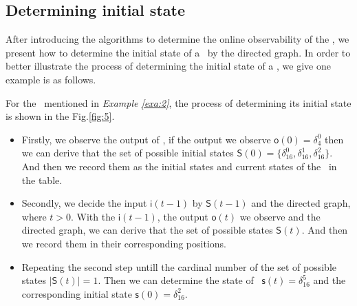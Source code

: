 \subsection{Determining initial state}

After introducing the algorithms to determine the online observability of the \BCNs, we present how to determine the initial state of a \BCN\ by the directed graph. In order to better illustrate the process of determining the initial state of a \BCN, we give one example is as follows.
\begin{example}
For the \BCN\ mentioned in {\em Example \ref{exa:2}}, the process of determining its initial state is shown in the Fig.\ref{fig:5}. 
\begin{itemize}
  \item Firstly, we observe the output of \BCN, if the output we observe $\mathsf{o}(0)=\delta_4^0$ then we can derive that the set of possible initial states $\mathsf{S}(0)=\{\delta_{16}^0,\delta_{16}^1,\delta_{16}^2\}$. And then we record them as the initial states and current states of the \BCN\ in the table. 
  \item Secondly, we decide the input $\mathsf{i}(t-1)$ by $\mathsf{S}(t-1)$ and the directed graph, where $t>0$. With the $\mathsf{i}(t-1)$, the output $\mathsf{o}(t)$ we observe and the directed graph, we can derive that the set of possible states $\mathsf{S}(t)$. And then we record them in their corresponding positions. 
 \item Repeating the second step untill the cardinal number of the set of possible states $|\mathsf{S}(t)|=1$. Then we can determine the state of \BCN\ $\mathsf{s}(t)=\delta_{16}^{5}$ and the corresponding initial state $\mathsf{s}(0)=\delta_{16}^{2}$.
\end{itemize} 
\end{example}   

